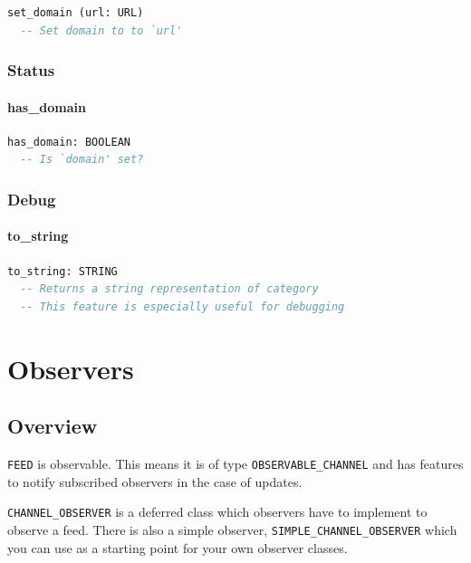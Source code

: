 \begin{lstlisting}[language=Eiffel]
set_domain (url: URL)
  -- Set domain to to `url'
\end{lstlisting}

\subsection{Status}
\label{sec:category-status}

\subsubsection{has\_domain}

\begin{lstlisting}[language=Eiffel]
has_domain: BOOLEAN
  -- Is `domain' set?
\end{lstlisting}

\subsection{Debug}
\label{sec:category-debug}


\subsubsection{to\_string}

\begin{lstlisting}[language=Eiffel]
to_string: STRING
  -- Returns a string representation of category
  -- This feature is especially useful for debugging
\end{lstlisting}


\chapter{Observers}
\label{cha:feed-observers}


\section{Overview}
\label{sec:feed-observers-overview}

\texttt{FEED} is observable. This means it is of type
\texttt{OBSERVABLE\_CHANNEL} and has features to notify subscribed
observers in the case of updates.

\texttt{CHANNEL\_OBSERVER} is a deferred class which observers have to
implement to observe a feed. There is also a simple observer,
\texttt{SIMPLE\_CHANNEL\_OBSERVER} which you can use as a starting
point for your own observer classes.


